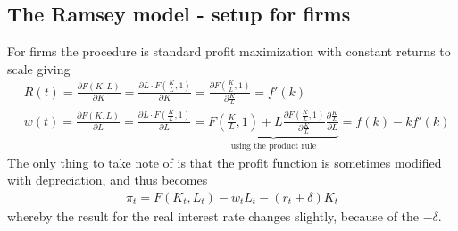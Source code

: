 \documentclass[12pt, a4paper]{article}
\begin{document}
\begin{spacing}{1.213}
\subsection{The Ramsey model - setup for firms }
For firms the procedure is standard profit maximization with constant returns to scale giving
\begin{align*}
&R(t) = \frac{\partial F(K,L)}{\partial K} = \frac{\partial L \cdot F(\frac{K}{L},1)}{\partial K} = \frac{\partial F(\frac{K}{L},1)}{\partial \frac{K}{L}} = f'(k) \\
&w(t) =  \frac{\partial F(K,L)}{\partial L} = \frac{\partial L \cdot F(\frac{K}{L},1)}{\partial L} =\underbrace{F(\frac{K}{L},1) + L\frac{\partial F(\frac{K}{L},1)}{\partial \frac{K}{L}} \frac{\partial \frac{K}{L}}{\partial L}}_{\textrm{using the product rule}} =  f(k) - kf'(k)
\end{align*}
The only thing to take note of is that the profit function is sometimes modified with depreciation, and thus becomes
\begin{align*}
\pi_t = F(K_t,L_t) - w_tL_t - (r_t+\delta)K_t
\end{align*}
whereby the result for the real interest rate changes slightly, because of the $-\delta$.


\end{spacing}
\end{document}

